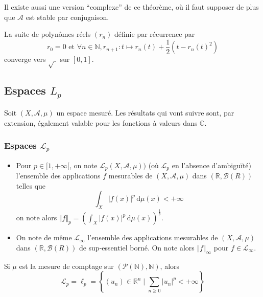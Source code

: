   \begin{remark}
    Il existe aussi une version ``complexe'' de ce théorème, où il faut supposer de plus que $\mathcal{A}$ est stable par conjugaison.
  \end{remark}

  \begin{example}
    La suite de polynômes réels $(r_n)$ définie par récurrence par
    \[ r_0 = 0 \text{ et } \forall n \in \mathbb{N}, r_{n+1} : t \mapsto r_n(t) + \frac{1}{2} (t - r_n(t)^2) \]
    converge vers $\sqrt{.}$ sur $[0,1]$.
  \end{example}

  \subsection{Espaces \texorpdfstring{$L_p$}{Lp}}


  Soit $(X, \mathcal{A}, \mu)$ un espace mesuré. Les résultats qui vont suivre sont, par extension, également valable pour les fonctions à valeurs dans $\mathbb{C}$.

  \subsubsection{Espaces \texorpdfstring{$\mathcal{L}_p$}{ℒp}}

  \begin{definition}
    \begin{itemize}
      \item Pour $p \in [1, +\infty[$, on note $\mathcal{L}_p(X, \mathcal{A}, \mu))$ (où $\mathcal{L}_p$ en l'absence d'ambiguïté) l'ensemble des applications $f$ mesurables de $(X, \mathcal{A}, \mu)$ dans $(\mathbb{R}, \mathcal{B}(R))$ telles que
      \[ \int_X \vert f(x) \vert^p \, \mathrm{d}\mu(x) < +\infty \]
      on note alors $\Vert f \Vert_p = \left(\int_X \vert f(x) \vert^p \, \mathrm{d}\mu(x)\right)^{\frac{1}{p}}$.
      \item On note de même $\mathcal{L}_\infty$ l'ensemble des applications mesurables de $(X, \mathcal{A}, \mu)$ dans $(\mathbb{R}, \mathcal{B}(R))$ de sup-essentiel borné. On note alors $\Vert f \Vert_\infty$ pour $f \in \mathcal{L}_\infty$.
    \end{itemize}
  \end{definition}


  \begin{example}
    Si $\mu$ est la mesure de comptage sur $(\mathcal{P}(\mathbb{N}), \mathbb{N})$, alors
    \[ \mathcal{L}_p = \ell_p = \left\{ (u_n) \in \mathbb{R}^n \mid \sum_{n \geq 0} \vert u_n \vert^p < +\infty \right\} \]
  \end{example}


